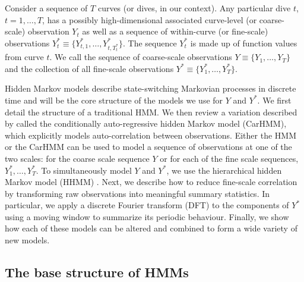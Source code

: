 
Consider a sequence of $T$ curves (or dives, in our context). Any particular dive $t$, $t = 1,
\ldots,T$, has a possibly high-dimensional associated curve-level (or coarse-scale) observation $Y_t$ as well as a sequence of within-curve (or fine-scale) observations $Y^*_{t} \equiv \Big\{Y^*_{t,1},\ldots,Y^*_{t,T^*_t}\Big\}$. The sequence $Y^*_{t}$ is made up of function values from curve $t$. We call the sequence of coarse-scale observations $Y \equiv \Big\{Y_1, \ldots, Y_T\Big\}$ and the collection of all fine-scale observations $Y^* \equiv \Big\{Y^*_1,\ldots,Y^*_T \Big\}$.

Hidden Markov models describe state-switching Markovian processes in discrete time and will be the core structure of the models we use for $Y$ and $Y^*$. We first detail the structure of a traditional HMM. We then review a variation described by \cite{Lawler:2019} called the conditionally auto-regressive hidden Markov model (CarHMM), which explicitly models auto-correlation between observations. Either the HMM or the CarHMM can be used to model a sequence of observations at one of the two scales: for the coarse scale sequence $Y$ or for each of the fine scale sequences, $Y_1^*,\ldots, Y_T^*$. To simultaneously model $Y$ and $Y^*$, we use the hierarchical hidden Markov model (HHMM) \citep{Barajas:2017,Adam:2019}.
Next, we describe how to reduce fine-scale correlation by transforming raw observations into meaningful summary statistics. In particular, we apply a discrete Fourier transform (DFT) to the components of $Y^*$ using a moving window to summarize its periodic behaviour. Finally, we show how each of these models can be altered and combined to form a wide variety of new models.

\subsection{The base structure of HMMs}

